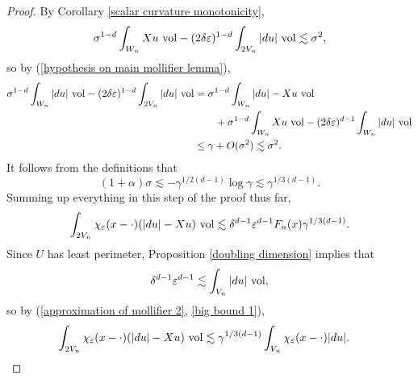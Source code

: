 \begin{proof}
By Corollary \ref{scalar curvature monotonicity},
$$\sigma^{1 - d} \int_{W_n} X u ~\mathrm{vol} - (2\delta\varepsilon)^{1 - d} \int_{2V_n} |du| ~\mathrm{vol} \lesssim \sigma^2,$$
so by (\ref{hypothesis on main mollifier lemma}),
\begin{align*}
\sigma^{1 - d} \int_{W_n} |du| ~\mathrm{vol} - (2\delta\varepsilon)^{1 - d} \int_{2V_n} |du| ~\mathrm{vol} &= \sigma^{1 - d} \int_{W_n} |du| - Xu ~\mathrm{vol} \\
&\qquad + \sigma^{1 - d} \int_{W_n} Xu ~\mathrm{vol} - (2\delta\varepsilon)^{d - 1} \int_{W_n} |du| ~\mathrm{vol} \\
&\leq \gamma + O(\sigma^2) \lesssim \sigma^2.
\end{align*}
It follows from the definitions that
$$(1 + \alpha)\sigma \lesssim -\gamma^{1/2(d - 1)} \log \gamma \lesssim \gamma^{1/3(d - 1)}.$$
Summing up everything in this step of the proof thus far,
\begin{equation}\label{big bound 1}
\int_{2V_n} \chi_\varepsilon(x - \cdot)(|du| - Xu) ~\mathrm{vol} \lesssim \delta^{d - 1} \varepsilon^{d - 1} F_n(x) \gamma^{1/3(d - 1)}.
\end{equation}
Since $U$ has least perimeter, Proposition \ref{doubling dimension} implies that
$$\delta^{d - 1} \varepsilon^{d - 1} \lesssim \int_{V_n} |du| ~\mathrm{vol},$$
so by (\ref{approximation of mollifier 2}, \ref{big bound 1}),
\begin{align*}
\int_{2V_n} \chi_\varepsilon(x - \cdot)(|du| - Xu) ~\mathrm{vol}
&\lesssim \gamma^{1/3(d - 1)} \int_{V_n} \chi_\varepsilon(x - \cdot)|du|.
\qedhere \end{align*}
\end{proof}

